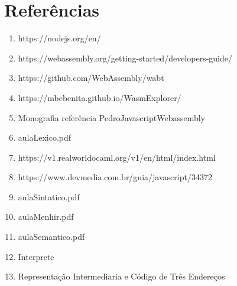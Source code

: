 \documentclass[12pt,a4paper,twoside]{article}
\begin{document}
\section*{Referências}
    \begin{enumerate}
        \item {} https://nodejs.org/en/
        
        \item {} https://webassembly.org/getting-started/developers-guide/
        
        \item {}https://github.com/WebAssembly/wabt
        
        \item {}https://mbebenita.github.io/WasmExplorer/
        
       \item {}Monografia referência PedroJavascriptWebassembly
       
       \item {}aulaLexico.pdf
       
       \item {}https://v1.realworldocaml.org/v1/en/html/index.html
        \item {} https://www.devmedia.com.br/guia/javascript/34372
    
        \item {}aulaSintatico.pdf
        \item {}aulaMenhir.pdf
        
        \item {}aulaSemantico.pdf
        
       \item {}Interprete
       
       \item {}Representação Intermediaria e Código de Três Endereços
    
    \end{enumerate}

\end{document}
